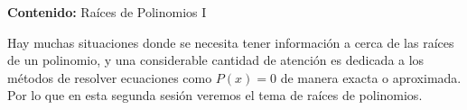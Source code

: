{\Large\textbf{Contenido:} Raíces de Polinomios I}

Hay muchas situaciones donde se necesita tener información a cerca de las raíces de un polinomio, y una considerable cantidad de atención es dedicada a los métodos de resolver ecuaciones como $P(x) = 0$ de manera exacta o aproximada.
Por lo que en esta segunda sesión veremos el tema de raíces de polinomios.